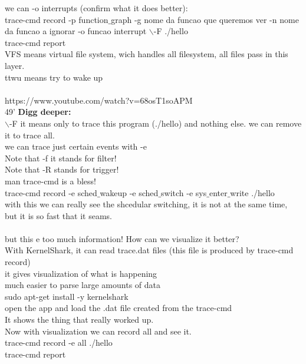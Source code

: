 \documentclass[11pt, a4paper, oneside]{article}
\theoremstyle{definition}
\begin{document}
we can -o interrupts (confirm what it does better):\\
trace-cmd record -p function$\_$graph -g nome da funcao que queremos ver -n nome da funcao a ignorar -o funcao interrupt $\backslash$-F ./hello\\
trace-cmd report\\

VFS means virtual file system, wich handles all filesystem, all files pass in this layer.\\
ttwu means try to wake up\\
\\
https://www.youtube.com/watch?v=68osT1soAPM\\
49'
\textbf{Digg deeper:}\\
$\backslash$-F  it means only to trace this program (./hello) and nothing else. we can remove it to trace all.\\
we can trace just certain events with -e\\

Note that -f it stands for filter!\\
Note that -R stands for trigger!\\ 

man trace-cmd is a bless!\\

trace-cmd record -e sched$\_$wakeup -e sched$\_$switch -e sys$\_$enter$\_$write ./hello\\
with this we can really see the shcedular switching, it is not at the same time, but it is so fast that it seams.\\
\\
but this e too much information! How can we visualize it better?\\
With KernelShark, it can read trace.dat files (this file is produced by trace-cmd record)\\
it gives visualization of what is happening\\
much easier to parse large amounts of data\\
sudo apt-get install -y kernelshark\\
open the app and load the .dat file created from the trace-cmd\\
It shows the thing that really worked up.\\

Now with visualization we can record all and see it.\\
trace-cmd record -e all ./hello\\
trace-cmd report\\
\end{document}
